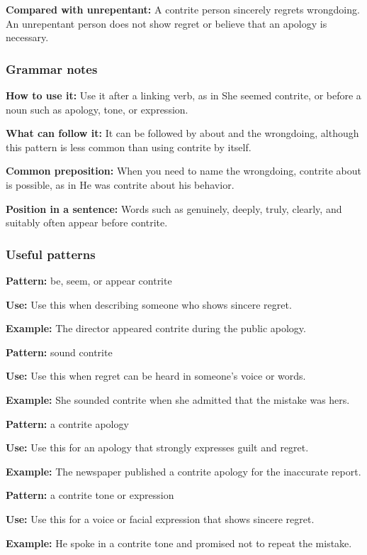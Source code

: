 \documentclass[11pt]{article}
\begin{document}
\textbf{Compared with unrepentant:} A contrite person sincerely regrets wrongdoing. An unrepentant person does not show regret or believe that an apology is necessary.

\subsubsection{Grammar notes}
\textbf{How to use it:} Use it after a linking verb, as in She seemed contrite, or before a noun such as apology, tone, or expression.

\textbf{What can follow it:} It can be followed by about and the wrongdoing, although this pattern is less common than using contrite by itself.

\textbf{Common preposition:} When you need to name the wrongdoing, contrite about is possible, as in He was contrite about his behavior.

\textbf{Position in a sentence:} Words such as genuinely, deeply, truly, clearly, and suitably often appear before contrite.

\subsubsection{Useful patterns}
\textbf{Pattern:} be, seem, or appear contrite

\textbf{Use:} Use this when describing someone who shows sincere regret.

\textbf{Example:} The director appeared contrite during the public apology.

\textbf{Pattern:} sound contrite

\textbf{Use:} Use this when regret can be heard in someone's voice or words.

\textbf{Example:} She sounded contrite when she admitted that the mistake was hers.

\textbf{Pattern:} a contrite apology

\textbf{Use:} Use this for an apology that strongly expresses guilt and regret.

\textbf{Example:} The newspaper published a contrite apology for the inaccurate report.

\textbf{Pattern:} a contrite tone or expression

\textbf{Use:} Use this for a voice or facial expression that shows sincere regret.

\textbf{Example:} He spoke in a contrite tone and promised not to repeat the mistake.
\end{document}

